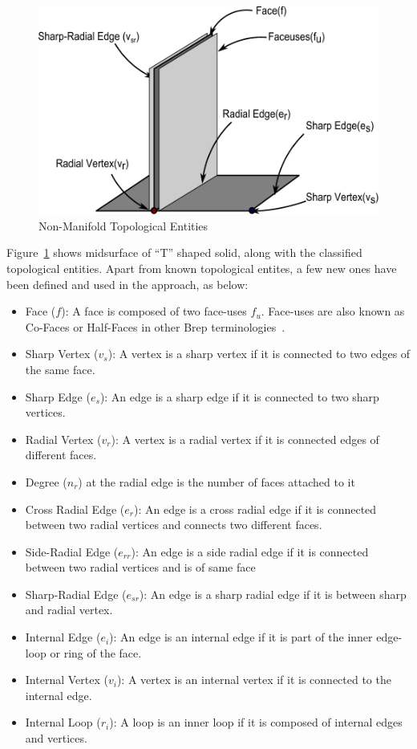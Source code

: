 
	\begin{figure}[!h]
	\centering     %
	\includegraphics[width=0.62\linewidth]{images/NonManifoldT2.pdf}
	\caption{Non-Manifold Topological Entities}
	\label{fig:topoval:nonmanifold}
	\end{figure}



Figure~\ref{fig:topoval:nonmanifold} shows midsurface of ``T'' shaped solid, along with the classified topological entities. Apart from known topological entites, a few new ones have been defined and used in the approach, as below:

\begin{itemize} 
[noitemsep,topsep=2pt,parsep=2pt,partopsep=2pt,label=\textbullet]\label{lst:topoval:topos}
\item Face ($f$): A face is composed of two face-uses $f_u$. Face-uses are also known as Co-Faces or Half-Faces in other Brep terminologies~\cite{Hegde2013}.

\item Sharp Vertex ($v_s$): A vertex is a sharp vertex if it is connected to two edges of the same face.
\item Sharp Edge ($e_s$): An edge is a sharp edge if it is connected to two sharp vertices.

\item Radial Vertex ($v_{r}$): A vertex is a radial vertex if it is connected edges of different faces.
\item Degree ($n_{r}$) at the radial edge is the number of faces attached to it 
\item Cross Radial Edge ($e_{r}$): An edge is a cross radial edge if it is connected between two radial vertices and connects two different faces.
\item Side-Radial  Edge ($e_{rr}$): An edge is a side radial edge if it is connected between two radial vertices and is of same face
\item Sharp-Radial Edge ($e_{sr}$): An edge is a sharp radial edge if it is between sharp and radial vertex.
\item Internal Edge ($e_i$): An edge is an internal edge if it is part of the inner edge-loop or ring of the face.
\item Internal Vertex ($v_i$): A vertex is an internal vertex if it is connected to the internal edge.
\item Internal Loop ($r_i$): A loop is an inner loop if it is composed of internal edges and vertices.
\end{itemize}

